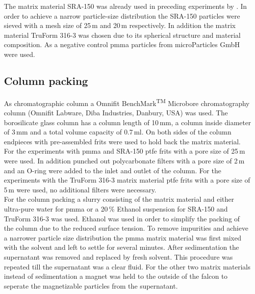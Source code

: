 The matrix material SRA-150 was already used in preceding experiments by \cite{AndreMaster}. In order to achieve a narrow particle-size distribution the SRA-150 particles were sieved with a mesh size of 25\,\textmu m and 20\,\textmu m respectively. In addition the matrix material TruForm 316-3 was chosen due to its spherical structure and material composition. 
As a negative control \gls{pmma} particles from microParticles GmbH were used. 

\subsection{Column packing}
\label{subsec:col_pack}
As chromatographic column a Omnifit\textsuperscript{\textregistered} BenchMark\textsuperscript{TM} Microbore chromatography column (Omnifit Labware, Diba Industries, Danbury, USA) was used. The borosilicate glass column has a column length of 10\,mm, a column inside diameter of 3\,mm and a total volume capacity of 0.7\,ml. On both sides of the column endpieces with pre-assembled frits were used to hold back the matrix material. For the experiments with \gls{pmma} and SRA-150 \gls{ptfe} frits with a pore size of 25\,\textmu m were used. In addition punched out polycarbonate filters with a pore size of 2\,\textmu m and an O-ring were added to the inlet and outlet of the column. For the experiments with the TruForm 316-3 matrix material \gls{ptfe} frits with a pore size of 5\,\textmu m were used, no additional filters were necessary. \\   
For the column packing a slurry consisting of the matrix material and either ultra-pure water for \gls{pmma} or a 20\,\% Ethanol suspension for SRA-150 and TruForm 316-3 was used. Ethanol was used in order to simplify the packing of the column due to the reduced surface tension. To remove impurities and achieve a narrower particle size distribution the \gls{pmma} matrix material was first mixed with the solvent and left to settle for several minutes. After sedimentation the supernatant was removed and replaced by fresh solvent. This procedure was repeated till the supernatant was a clear fluid. For the other two matrix materials instead of sedimentation a magnet was held to the outside of the falcon to seperate the magnetizable particles from the supernatant.\\   
